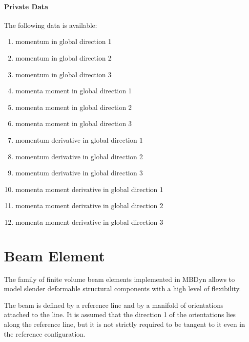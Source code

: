 \paragraph{Private Data}
The following data is available:
\begin{enumerate}
\item {} momentum in global direction 1
\item {} momentum in global direction 2
\item {} momentum in global direction 3
\item {} momenta moment in global direction 1
\item {} momenta moment in global direction 2
\item {} momenta moment in global direction 3
\item {} momentum derivative in global direction 1
\item {} momentum derivative in global direction 2
\item {} momentum derivative in global direction 3
\item {} momenta moment derivative in global direction 1
\item {} momenta moment derivative in global direction 2
\item {} momenta moment derivative in global direction 3
\end{enumerate}





\section{Beam Element}
The family of finite volume beam elements implemented in MBDyn
allows to model slender deformable structural components 
with a high level of flexibility.

\noindent
The beam is defined by a reference line and by a manifold
of orientations attached to the line.
It is assumed that the direction 1 of the orientations lies along
the reference line, but it is not strictly required to be tangent
to it even in the reference configuration.

